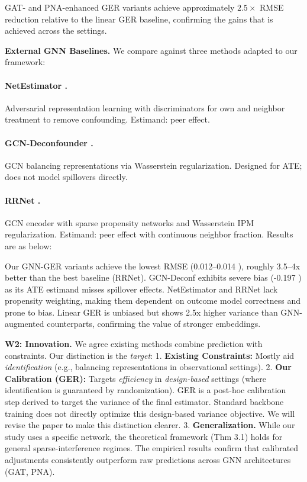 \documentclass{article}
\theoremstyle{plain}
\theoremstyle{definition}
\theoremstyle{remark}
\begin{document}
GAT- and PNA-enhanced GER variants achieve approximately $2.5\times$ RMSE
reduction relative to the linear GER baseline, confirming the gains that is achieved across the settings. 

\textbf{External GNN Baselines.} We compare against three methods adapted to our framework: \paragraph{NetEstimator \citep{jiang2022estimating}.} Adversarial representation learning with discriminators for own and neighbor treatment to remove confounding. Estimand: peer effect. \paragraph{GCN-Deconfounder \citep{guo2020learning}.} GCN balancing representations via Wasserstein regularization. Designed for ATE; does not model spillovers directly. \paragraph{RRNet \citep{cai2023generalization}.} GCN encoder with sparse propensity networks and Wasserstein IPM regularization. Estimand: peer effect with continuous neighbor fraction. Results are as below:
 

Our GNN-GER variants achieve the lowest RMSE (0.012--0.014 ), roughly 3.5--4x better than the best baseline (RRNet). GCN-Deconf exhibits severe bias (-0.197 ) as its ATE estimand misses spillover effects. NetEstimator and RRNet lack propensity weighting, making them dependent on outcome model correctness and prone to bias. Linear GER is unbiased but shows 2.5x higher variance than GNN-augmented counterparts, confirming the value of stronger embeddings.

\vspace{0.5em}
\noindent\textbf{W2: Innovation.}
We agree existing methods combine prediction with constraints. Our distinction is the \emph{target}: 
1. \textbf{Existing Constraints:} Mostly aid \emph{identification} (e.g., balancing representations in observational settings).
2. \textbf{Our Calibration (GER):} Targets \emph{efficiency} in \emph{design-based} settings (where identification is guaranteed by randomization). 
GER is a post-hoc calibration step derived to target the variance of the final estimator. Standard backbone training does not directly optimize this design-based variance objective. We will revise the paper to make this distinction clearer.
3. \textbf{Generalization.}
While our study uses a specific network, the theoretical framework (Thm 3.1) holds for general sparse-interference regimes. The empirical results confirm that calibrated adjustments consistently outperform raw predictions across GNN architectures (GAT, PNA).
\end{document}
